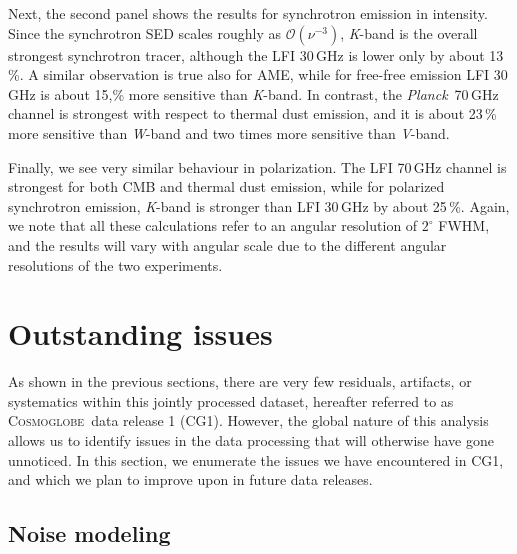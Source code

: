 \documentclass[twocolumn]{../../common/aa}
\def\Planck{\emph{Planck}}
\newcommand{\cosmoglobe}{\textsc{Cosmoglobe}}
\newcommand{\K}[0]{\textit K}
\newcommand{\V}[0]{\textit V}
\newcommand{\W}[0]{\textit W}
\begin{document}
Next, the second panel shows the results for synchrotron emission in intensity. Since the synchrotron SED scales roughly as $\mathcal{O}(\nu^{-3})$, \K-band is the overall strongest synchrotron tracer, although the LFI 30\,GHz is lower only by about 13\,\%. A similar observation is true also for AME, while for free-free emission LFI 30\,GHz is about 15,\% more sensitive than \K-band. In contrast, the \Planck\ 70\,GHz channel is strongest with respect to thermal dust emission, and it is about 23\,\% more sensitive than \W-band and two times more sensitive than \V-band.

Finally, we see very similar behaviour in polarization. The LFI 70\,GHz channel is strongest for both CMB and thermal dust emission, while for polarized synchrotron emission, \K-band is stronger than LFI 30\,GHz by about 25\,\%. Again, we note that all these calculations refer to an angular resolution of $2^{\circ}$ FWHM, and the results will vary with angular scale due to the different angular resolutions of the two experiments.

















\section{Outstanding issues}
\label{sec:issues}

As shown in the previous sections, there are very few residuals, artifacts, or systematics within this jointly processed dataset, hereafter referred to as \cosmoglobe\ data release 1 (CG1). However, the global nature of this analysis allows us to identify issues in the data processing that will otherwise have gone unnoticed. In this section, we enumerate the issues we have encountered in CG1, and which we plan to improve upon in future data releases.

\subsection{Noise modeling}
\label{sec:noisemodel}
\end{document}
